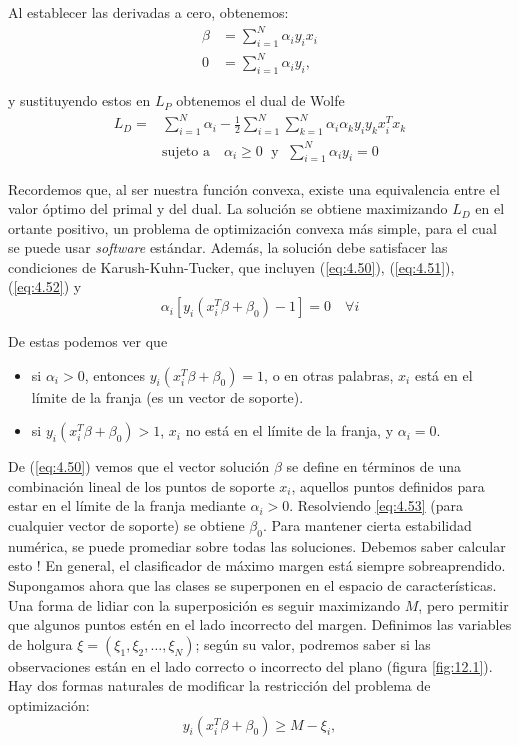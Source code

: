 \noindent Al establecer las derivadas a cero, obtenemos:
\begin{align}
\beta &= \sum_{i=1}^N \alpha_i y_i x_i \label{eq:4.50}\\
0 &= \sum_{i=1}^N \alpha_i y_i, \label{eq:4.51}
\end{align}

\noindent y sustituyendo estos en $L_P$ obtenemos el dual de Wolfe
\begin{align}
L_D =& \sum_{i=1}^N \alpha_i - \frac{1}{2} \sum_{i=1}^N \sum_{k=1}^N \alpha_i \alpha_k y_i y_k x_i^T x_k \\
& \text{sujeto a} \quad \alpha_i \geq 0 \; \text{ y } \; \sum_{i=1}^N \alpha_i y_i = 0 \label{eq:4.52}
\end{align}

Recordemos que, al ser nuestra función convexa, existe una equivalencia entre el valor óptimo del primal y del dual. La solución se obtiene maximizando $L_D$ en el ortante positivo, un problema de optimización convexa más simple, para el cual se puede usar \textit{software} estándar. Además, la solución debe satisfacer las condiciones de Karush-Kuhn-Tucker, que incluyen (\ref{eq:4.50}), (\ref{eq:4.51}), (\ref{eq:4.52}) y
\begin{equation}
\alpha_i [y_i (x_i^T \beta + \beta_0) - 1] = 0 \quad \forall i \label{eq:4.53}
\end{equation}

\noindent De estas podemos ver que
\begin{itemize}
    \item si $\alpha_i > 0$, entonces $y_i (x_i^T \beta + \beta_0) = 1$, o en otras palabras, $x_i$ está en el límite de la franja (es un vector de soporte).
    \item si $y_i (x_i^T \beta + \beta_0) > 1$, $x_i$ no está en el límite de la franja, y $\alpha_i = 0$.
\end{itemize}

De (\ref{eq:4.50}) vemos que el vector solución $\beta$ se define en términos de una combinación lineal de los puntos de soporte $x_i$, aquellos puntos definidos para estar en el límite de la franja mediante $\alpha_i > 0$. Resolviendo \ref{eq:4.53} (para cualquier vector de soporte) se obtiene $\beta_0$. Para mantener cierta estabilidad numérica, se puede promediar sobre todas las soluciones. Debemos saber calcular esto ! En general, el clasificador de máximo margen está siempre sobreaprendido. \\

Supongamos ahora que las clases se superponen en el espacio de características. Una forma de lidiar con la superposición es seguir maximizando $M$, pero permitir que algunos puntos estén en el lado incorrecto del margen. Definimos las variables de holgura $\xi = (\xi_1, \xi_2, \ldots, \xi_N)$; según su valor, podremos saber si las observaciones están en el lado correcto o incorrecto del plano (figura \ref{fig:12.1}). Hay dos formas naturales de modificar la restricción del problema de optimización:
\begin{equation}
y_i (x_i^T \beta + \beta_0) \geq M - \xi_i,
\end{equation}

